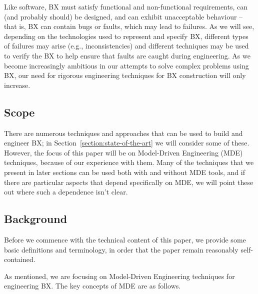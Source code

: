 Like software, BX must satisfy functional and non-functional requirements, can (and probably should) be designed, and can exhibit unacceptable behaviour -- that is, BX can contain bugs or faults, which may lead to failures. As we will see, depending on the technologies used to represent and specify BX, different types of failures may arise (e.g., inconsistencies) and different techniques may be used to verify the BX to help ensure that faults are caught during engineering. As we become increasingly ambitious in our attempts to solve complex problems using BX, our need for rigorous engineering techniques for BX construction will only increase.

\subsection{Scope}
There are numerous techniques and approaches that can be used to build and engineer BX; in Section~\ref{section:state-of-the-art} we will consider some of these. However, the focus of this paper will be on Model-Driven Engineering (MDE) techniques, because of our experience with them. Many of the techniques that we present in later sections can be used both with and without MDE tools, and if there are particular aspects that depend specifically on MDE, we will point these out where such a dependence isn't clear.

\subsection{Background}
Before we commence with the technical content of this paper, we provide some basic definitions and terminology, in order that the paper remain reasonably self-contained.

As mentioned, we are focusing on Model-Driven Engineering techniques for engineering BX. The key concepts of MDE are as follows.

